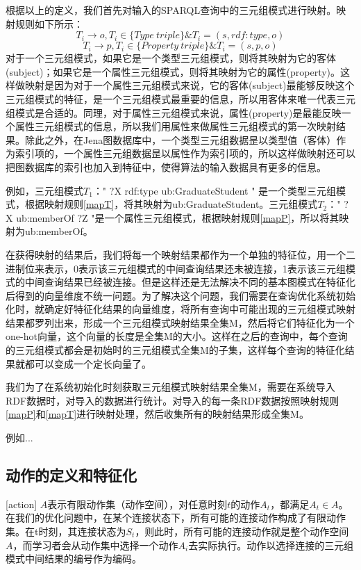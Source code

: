 根据以上的定义，我们首先对输入的SPARQL查询中的三元组模式进行映射。映射规则如下所示：
\begin{equation}
    \label{mapT}
    T_i \rightarrow o, T_i \in \lbrace Type\ triple\rbrace \& T_i = (s,rdf:type,o)   
\end{equation}
\begin{equation}
    \label{mapP}
    T_i \rightarrow p, T_i \in \lbrace Property\ triple\rbrace \& T_i = (s,p,o)   
\end{equation}
对于一个三元组模式，如果它是一个类型三元组模式，则将其映射为它的客体(subject)；如果它是一个属性三元组模式，则将其映射为它的属性(property)。这样做映射是因为对于一个属性三元组模式来说，它的客体(subject)最能够反映这个三元组模式的特征，是一个三元组模式最重要的信息，所以用客体来唯一代表三元组模式是合适的。同理，对于属性三元组模式来说，属性(property)是最能反映一个属性三元组模式的信息，所以我们用属性来做属性三元组模式的第一次映射结果。除此之外，在Jena图数据库中，一个类型三元组数据昰以类型值（客体）作为索引项的，一个属性三元组数据昰以属性作为索引项的，所以这样做映射还可以把图数据库的索引也加入到特征中，使得算法的输入数据具有更多的信息。

例如，三元组模式$T_1$：" ?X rdf:type ub:GraduateStudent " 是一个类型三元组模式，根据映射规则\ref{mapT}，将其映射为ub:GraduateStudent。三元组模式$T_2$：" ?X ub:memberOf ?Z "是一个属性三元组模式，根据映射规则\ref{mapP}，所以将其映射为ub:memberOf。

在获得映射的结果后，我们将每一个映射结果都作为一个单独的特征位，用一个二进制位来表示，0表示该三元组模式的中间查询结果还未被连接，1表示该三元组模式的中间查询结果已经被连接。但是这样还是无法解决不同的基本图模式在特征化后得到的向量维度不统一问题。为了解决这个问题，我们需要在查询优化系统初始化时，就确定好特征化结果的向量维度，将所有查询中可能出现的三元组模式映射结果都罗列出来，形成一个三元组模式映射结果全集M，然后将它们特征化为一个one-hot向量，这个向量的长度是全集M的大小。这样在之后的查询中，每个查询的三元组模式都会是初始时的三元组模式全集M的子集，这样每个查询的特征化结果就都可以变成一个定长向量了。

我们为了在系统初始化时刻获取三元组模式映射结果全集M，需要在系统导入RDF数据时，对导入的数据进行统计。对导入的每一条RDF数据按照映射规则\ref{mapP}和\ref{mapT}进行映射处理，然后收集所有的映射结果形成全集M。

例如...
\subsection{动作的定义和特征化}[action]
$A$表示有限动作集（动作空间），对任意时刻$t$的动作$A_t$，都满足$A_t \in A$。
在我们的优化问题中，在某个连接状态下，所有可能的连接动作构成了有限动作集。在t时刻，其连接状态为$S_t$，则此时，所有可能的连接动作就是整个动作空间$A$，而学习者会从动作集中选择一个动作$A_i$去实际执行。动作以选择连接的三元组模式中间结果的编号作为编码。

